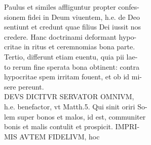 \documentclass{article}
\begin{document}
\begin{pages}
                Paulus et similes affliguntur propter confes- \\
                sionem fidei in Deum viuentem, h.e. de Deo \\
                sentiunt et credunt quae filius Dei iussit nos \\
                credere. Hanc doctrinami deformant hypo- \\
                critae in ritus et ceremnomias bona parte. \\
                Tertio, differunt etiam euentu, quia pii lae- \\
                to rerum fine sperata bona obtinent: contra \\
                hypocritae spem irritam fouent, et ob id mi- \\
                sere pereunt. \\
                DEVS DICITVR SERVATOR OMNIVM, \\
                h.e. benefactor, vt Matth.5. Qui sinit oriri So- \\
                lem super bonos et malos, id est, communiter \\
                bonis et malis contulit et prospicit. IMPRI- \\
                MIS AVTEM FIDELIVM, hoc \\
                

\end{pages}
\end{document}
